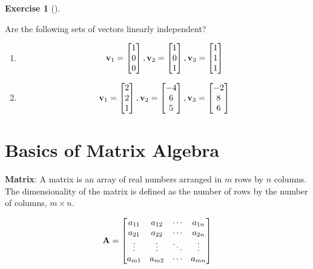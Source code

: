 \documentclass[
  letterpaper,
]{book}
\theoremstyle{definition}
\theoremstyle{definition}
\theoremstyle{plain}
\theoremstyle{definition}
\newtheorem{exercise}{Exercise}[chapter]
\theoremstyle{plain}
\theoremstyle{plain}
\theoremstyle{remark}
\begin{document}
\leavevmode{}%
\begin{exercise}[]\label{exr-linearindep1}

Are the following sets of vectors linearly independent?

\begin{enumerate}
\def\labelenumi{\arabic{enumi}.}
\item
  \[{\bf v}_1 = \begin{bmatrix} 1 \\ 0 \\ 0 \end{bmatrix} , {\bf v}_2 = \begin{bmatrix} 1 \\ 0 \\ 1 \end{bmatrix} , {\bf v}_3 = \begin{bmatrix} 1 \\ 1 \\ 1 \end{bmatrix} \]
\item
  \[{\bf v}_1 = \begin{bmatrix} 2 \\ 2 \\ 1 \end{bmatrix} , {\bf v}_2 = \begin{bmatrix} -4 \\ 6 \\ 5 \end{bmatrix} , {\bf v}_3 = \begin{bmatrix} -2 \\ 8 \\ 6 \end{bmatrix} \]
\end{enumerate}

\end{exercise}

\hypertarget{matrixbasics}{%
\section{Basics of Matrix Algebra}\label{matrixbasics}}

\textbf{Matrix}: A matrix is an array of real numbers arranged in \(m\)
rows by \(n\) columns. The dimensionality of the matrix is defined as
the number of rows by the number of columns, \(m \times n\).

\[{\bf A}=\begin{bmatrix}
    a_{11} & a_{12} & \cdots & a_{1n} \\
    a_{21} & a_{22} & \cdots & a_{2n} \\
    \vdots & \vdots & \ddots & \vdots \\
    a_{m1} & a_{m2} & \cdots & a_{mn}
\end{bmatrix}\]
\end{document}
